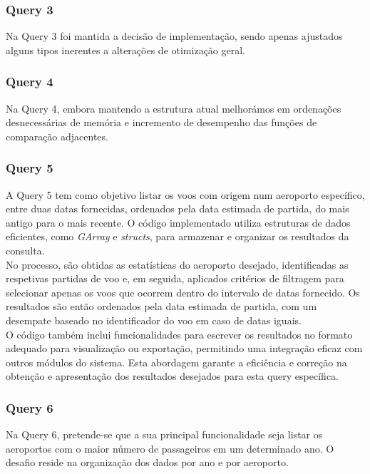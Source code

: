 \documentclass[12pt,a4paper]{article}
\begin{document}
    \subsubsection{Query 3}
    \hspace{0,6cm}Na Query 3 foi mantida a decisão de implementação, sendo apenas ajustados alguns tipos inerentes a alterações de otimização geral.
       
    \subsubsection{Query 4}
    \hspace{0,6cm}Na Query 4, embora mantendo a estrutura atual melhorámos em ordenações desnecessárias de memória e incremento de desempenho das funções de comparação adjacentes.

    \subsubsection{Query 5}
    \hspace{0,6cm}A Query 5 tem como objetivo listar os voos com origem num aeroporto específico, entre duas datas fornecidas, ordenados pela data estimada de partida, do mais antigo para o mais recente. O código implementado utiliza estruturas de dados eficientes, como \textit{GArray} e \textit{structs}, para armazenar e organizar os resultados da consulta.\\

    No processo, são obtidas as estatísticas do aeroporto desejado, identificadas as respetivas partidas de voo e, em seguida, aplicados critérios de filtragem para selecionar apenas os voos que ocorrem dentro do intervalo de datas fornecido. Os resultados são então ordenados pela data estimada de partida, com um desempate baseado no identificador do voo em caso de datas iguais.\\

    O código também inclui funcionalidades para escrever os resultados no formato adequado para visualização ou exportação, permitindo uma integração eficaz com outros módulos do sistema. Esta abordagem garante a eficiência e correção na obtenção e apresentação dos resultados desejados para esta query específica.

    \subsubsection{Query 6}
    \hspace{0,6cm}Na Query 6, pretende-se que a sua principal funcionalidade seja listar os aeroportos com o maior número de passageiros em um determinado ano. O desafio reside na organização dos dados por ano e por aeroporto.\\
\end{document}
